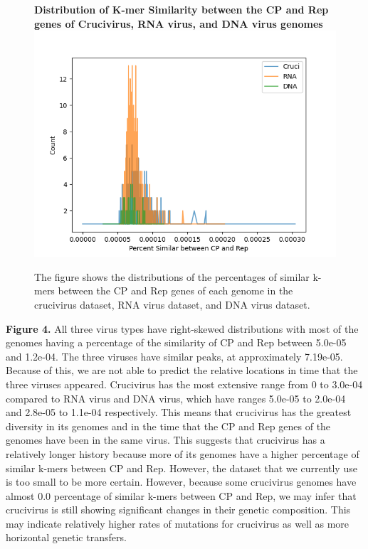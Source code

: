 \documentclass[eng]{ajceam-class}
\begin{document}
\begin{figure}
    \centering
    \textbf{Distribution of K-mer Similarity between the CP and Rep genes of Crucivirus, RNA virus, and DNA virus genomes}
    \includegraphics[scale = 0.6]{KmerSimilarityCpRep.png}
    \caption{The figure shows the distributions of the percentages of similar k-mers between the CP and Rep genes of each genome in the crucivirus dataset, RNA virus dataset, and DNA virus dataset. }
\end{figure}
\textbf{Figure 4.} All three virus types have right-skewed distributions with most of the genomes having a percentage of the similarity of CP and Rep between 5.0e-05 and 1.2e-04. The three viruses have similar peaks, at approximately 7.19e-05. Because of this, we are not able to predict the relative locations in time that the three viruses appeared. Crucivirus has the most extensive range from 0 to 3.0e-04 compared to RNA virus and DNA virus, which have ranges 5.0e-05 to 2.0e-04 and 2.8e-05 to 1.1e-04 respectively. This means that crucivirus has the greatest diversity in its genomes and in the time that the CP and Rep genes of the genomes have been in the same virus. This suggests that crucivirus has a relatively longer history because more of its genomes have a higher percentage of similar k-mers between CP and Rep. However, the dataset that we currently use is too small to be more certain. However, because some crucivirus genomes have almost 0.0 percentage of similar k-mers between CP and Rep, we may infer that crucivirus is still showing significant changes in their genetic composition. This may indicate relatively higher rates of mutations for crucivirus as well as more horizontal genetic transfers.
\end{document}
